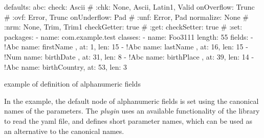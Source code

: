 \begin{elisting}[!htb]
\begin{yamlcode}
defaults:
  abc:
    check: Ascii        # :chk: None, Ascii, Latin1, Valid
    onOverflow: Trunc   # :ovf: Error, Trunc
    onUnderflow: Pad    # :unf: Error, Pad
    normalize: None     # :nrm: None, Trim, Trim1
    checkGetter: true   # :get:
    checkSetter: true   # :set:
packages:
  - name: com.example.test
    classes:
      - name: Foo3111
        length: 55
        fields:
          - !Abc { name: firstName   , at:  1, len: 15 }
          - !Abc { name: lastName    , at: 16, len: 15 }
          - !Num { name: birthDate   , at: 31, len:  8 }
          - !Abc { name: birthPlace  , at: 39, len: 14 }
          - !Abc { name: birthCountry, at: 53, len:  3 }
\end{yamlcode}
\caption{example of definition of alphanumeric fields}
\label{lst:xmplAbc}
\end{elisting}

In the example, the default node of alphanumeric fields is set using the 
canonical names of the parameters. The \textit{plugin} uses an available 
functionality of the library to read the yaml file, and defines short parameter 
names, which can be used as an alternative to the canonical names.

